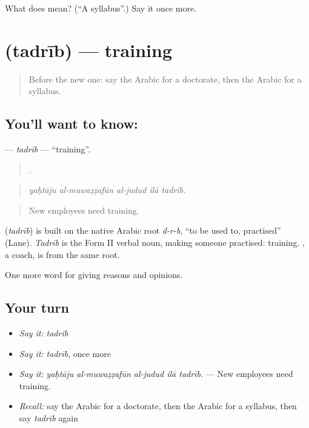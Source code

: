 \begin{tcolorbox}[breakable,colback=teal!4,colframe=teal!35!black,title={Before you move on}]
What does  mean? (\textquotedblleft{}A syllabus\textquotedblright{}.) Say it once more.
\end{tcolorbox}
\section[\texorpdfstring{\ar{تدريب} (tadrīb)}{تدريب (tadrīb)}]{ (tadrīb) — training}

\label{lesson:AR-C397-tadrib}



\begin{quote}
Before the new one: say the Arabic for a doctorate, then the Arabic for a syllabus.
\end{quote}

\subsection*{You'll want to know: }
\textbf{} — \emph{tadrīb} — \textquotedblleft{}training\textquotedblright{}.

\begin{quote}
    .
\end{quote}

\begin{quote}
\emph{yaḥtāju al-muwaẓẓafūn al-judud ilā tadrīb.}
\end{quote}

\begin{quote}
New employees need training.
\end{quote}

\begin{cousinweb}
\textbf{} (\emph{tadrīb}) is built on the native Arabic root \emph{d-r-b}, \textquotedblleft{}to be used to, practised\textquotedblright{} (Lane). \emph{Tadrīb} is the Form II verbal noun, making someone practised: training. , a coach, is from the same root.
\end{cousinweb}

\begin{grammarlens}[title={What you've built}]
One more word for giving reasons and opinions.
\end{grammarlens}

\subsection*{Your turn}
\begin{itemize}
\raggedright
  \item \emph{Say it:} \emph{tadrīb}
  \item \emph{Say it:} \emph{tadrīb}, once more
  \item \emph{Say it:} \emph{yaḥtāju al-muwaẓẓafūn al-judud ilā tadrīb.} — New employees need training.
  \item \emph{Recall:} say the Arabic for a doctorate, then the Arabic for a syllabus, then say \emph{tadrīb} again
\end{itemize}

